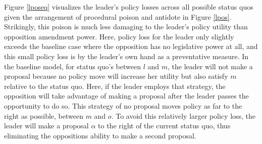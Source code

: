 \documentclass[12pt]{article}
\theoremstyle{plain}		      \newtheorem{assn}{Assumption}
\theoremstyle{plain}		      \newtheorem{prop}{Proposition}
\theoremstyle{plain}		      \newtheorem{lemma}{Lemma}
\theoremstyle{plain}	          \newtheorem{imp}{Implication}
\theoremstyle{plain}	          \newtheorem{hyp}{Hypothesis}
\theoremstyle{definition}		  \newtheorem{defn}{Definition}
\theoremstyle{remark}	          \newtheorem{rem}{Remark}
\theoremstyle{definition}         \newtheorem{case}{Case}
\begin{document}
\indent Figure \ref{lposeq} visualizes the leader's policy losses across all possible status quos given the arrangement of procedural poison and antidote in Figure \ref{lpos}. Strikingly, this poison is much less damaging to the leader's policy utility than opposition amendment power. Here, policy loss for the leader only slightly exceeds the baseline case where the opposition has no legislative power at all, and this small policy loss is by the leader's own hand as a preventative measure. In the baseline model, for status quo's between $l$ and $m$, the leader will not make a proposal because no policy move will increase her utility but also satisfy $m$ relative to the status quo. Here, if the leader employs that strategy, the opposition will take advantage of making a proposal after the leader passes the opportunity to do so. This strategy of no proposal moves policy as far to the right as possible, between $m$ and $o$. To avoid this relatively larger policy loss, the leader will make a proposal $\alpha$ to the right of the current status quo, thus eliminating the oppositions ability to make a second proposal.
\end{document}
